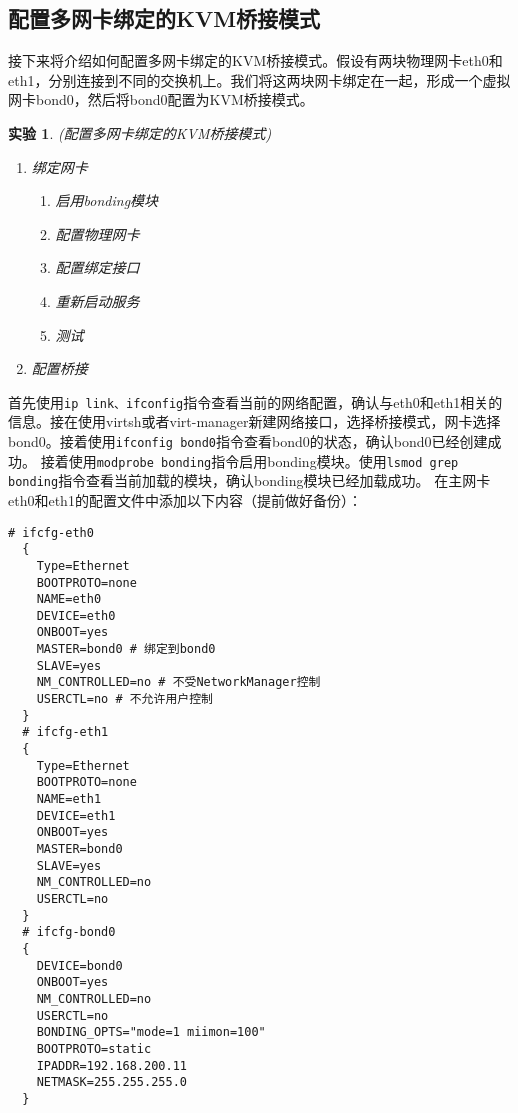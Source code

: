 \documentclass[12pt, twoside, openany]{book}
\theoremstyle{brack}
\newtheorem{lab}{实验}[chapter]
\begin{document}
\subsection{配置多网卡绑定的KVM桥接模式}
接下来将介绍如何配置多网卡绑定的KVM桥接模式。假设有两块物理网卡eth0和eth1，分别连接到不同的交换机上。我们将这两块网卡绑定在一起，形成一个虚拟网卡bond0，然后将bond0配置为KVM桥接模式。
\begin{lab}
  (配置多网卡绑定的KVM桥接模式)
  \begin{enumerate}
    \item 绑定网卡
    \begin{enumerate}
      \item 启用bonding模块
      \item 配置物理网卡
      \item 配置绑定接口
      \item 重新启动服务
      \item 测试
    \end{enumerate}
    \item 配置桥接
  \end{enumerate}
\end{lab}
首先使用\lstinline|ip link、ifconfig|指令查看当前的网络配置，确认与eth0和eth1相关的信息。接在使用virtsh或者virt-manager新建网络接口，选择桥接模式，网卡选择bond0。接着使用\lstinline|ifconfig bond0|指令查看bond0的状态，确认bond0已经创建成功。
接着使用\lstinline|modprobe bonding|指令启用bonding模块。使用\lstinline|lsmod grep bonding|指令查看当前加载的模块，确认bonding模块已经加载成功。
在主网卡eth0和eth1的配置文件中添加以下内容（提前做好备份）：
\begin{lstlisting}[caption={网卡配置文件}]
  # ifcfg-eth0
  {
    Type=Ethernet
    BOOTPROTO=none
    NAME=eth0
    DEVICE=eth0
    ONBOOT=yes
    MASTER=bond0 # 绑定到bond0
    SLAVE=yes
    NM_CONTROLLED=no # 不受NetworkManager控制
    USERCTL=no # 不允许用户控制
  }
  # ifcfg-eth1
  {
    Type=Ethernet
    BOOTPROTO=none
    NAME=eth1
    DEVICE=eth1
    ONBOOT=yes
    MASTER=bond0
    SLAVE=yes
    NM_CONTROLLED=no
    USERCTL=no
  }
  # ifcfg-bond0
  {
    DEVICE=bond0
    ONBOOT=yes
    NM_CONTROLLED=no
    USERCTL=no
    BONDING_OPTS="mode=1 miimon=100"
    BOOTPROTO=static
    IPADDR=192.168.200.11
    NETMASK=255.255.255.0
  }
\end{lstlisting}
\end{document}
